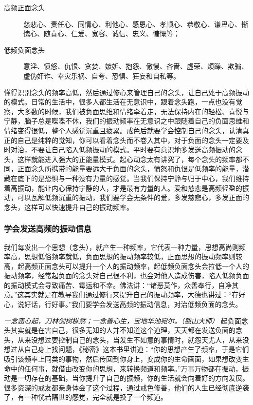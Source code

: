 \begin{description}
    \item[高频正面念头] 慈悲心、责任心、同情心、利他心、感恩心、孝顺心、恭敬心、谦卑心、惭愧心、随喜心、仁爱、宽容、诚信、忠义、慷慨等；
    \item[低频负面念头] 意淫、愤怒、仇恨、贪婪、嫉妒、抱怨、傲慢、吝啬、虚荣、烦躁、欺骗、虚伪奸诈、幸灾乐祸、自夸、恐惧、狂妄和自私等。
\end{description}

懂得识别念头的频率高低，然后通过修心来管理自己的念头，让自己处于高频振动的模式。日常的生活中，很多人都生活在无意识中，跟着念头跑，一点也没有觉察，大多数的时候，我们被负面思维和情绪牵着走，无法保持内在的轻松、喜悦与宁静，脑子总是喋喋不休，我们的振动频率在无意识之中跟随着自己的负面思维和情绪变得很低，整个人感觉沉重且疲累。戒色后就要学会控制自己的念头，认清真正的自己是纯粹的觉知，你可以看着念头而不卷入其中，对于负面的念头一定要及时对治，不要让自己陷入低频振动的模式。平时要有意识地多发送高频振动的念头，这样就能进入强大的正能量模式。起心动念太有讲究了，每个念头的频率都不同，正面念头所携带的能量要远大于负面的念头，愤怒和仇恨是低频率的能量，潜藏在底下的是恐惧与一种没有力量的感觉。当我们保持宁静与归于中心，我们维持着高振动，能让内心保持宁静的人，才是最有力量的人。爱和慈悲是高频轻盈的振动，可以瓦解低频沉重的振动，我们要学会无条件的爱，多发慈悲心，多发正面的念头，这样可以快速提升自己的振动频率。

\subsubsection{学会发送高频的振动信息}

我们每发出一个思想（念头），就产生一种频率，它代表一种力量，思想高尚则频率高，思想低俗频率就低，负面思想的振动频率较低，正面思想的振动频率则较高，起高频正面念头可以提升一个人的振动频率，起低频负面念头会拉低一个人的振动频率，经常起负面的念头对自己很不利，也会对他人造成伤害，陷入低频负面的振动模式会导致痛苦、霉运和不幸。佛法讲：“诸恶莫作，众善奉行，自净其意。”这其实就是在教导我们通过修行来提升自己的振动频率，大德也讲过：“存好心，说好话，行好事。”我们要学会发送高频的振动信息，对治低频负面的念头。

\textit{一念恶心起，刀林剑树枞然；一念善心生，宝地华池宛尔。（憨山大师）} 起负面念头其实就是在害自己，很多无知的人并不知道这个道理，天天都在发送负面的念头，从来没想过要控制自己的念头，当发生不如意的事情时，就怨天尤人，从来没想过从自己身上找问题，《秘密》这本书里讲道：“你的思想产生了频率，于是它们吸引该频率上同类的事物，然后传回到你身上，变成你的生命画面，如果想改变生命中的任何事，就借由改变你的思想，来转换频道和频率。”万事万物都在振动，振动是一切存在的基础，当你提升了自己的振频，你的生活就会向着好的方向发展。很多资深的戒友都亲身体会了这个过程，通过戒色修善，他们的人生已经彻底逆袭了，有一种恍若隔世的感觉，完全就是换了一个频道。


